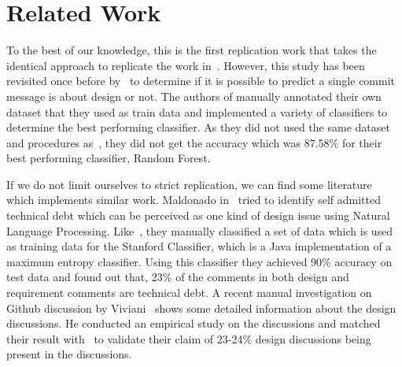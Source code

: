 \section{Related Work}
\label{sect:related_work}
To the best of our knowledge, this is the first replication work that takes the identical approach to replicate the work in~\cite{Brunet2014a}. However, this study has been revisited once before by~\cite{Shakiba2016} to determine if it is possible to predict a single commit message is about design or not. The authors of \cite{Shakiba2016} manually annotated their own dataset that they used as train data and implemented a variety of classifiers to determine the best performing classifier. As they did not used the same dataset and procedures as~\cite{Brunet2014a}, they did not get the accuracy which was 87.58\% for their best performing classifier, Random Forest.

If we do not limit ourselves to strict replication, we can find some literature which implements similar work. Maldonado in~\cite{Maldonado2017} tried to identify self admitted technical debt which can be perceived as one kind of design issue using Natural Language Processing. Like~\cite{Brunet2014a}, they manually classified a set of data which is used as training data for the Stanford Classifier, which is a Java implementation of a maximum entropy classifier. Using this classifier they achieved 90\% accuracy on test data and found out that, 23\% of the comments in both design and requirement comments are technical debt. A recent manual investigation on Github discussion by Viviani~\cite{Viviani2018} shows some detailed information about the design discussions. He conducted an empirical study on the discussions and matched their result with~\cite{Brunet2014a} to validate their claim of 23-24\% design discussions being present in the discussions.   
